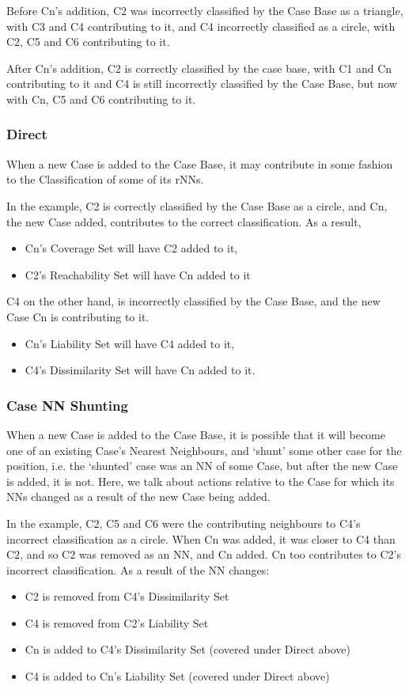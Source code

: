 \documentclass[a4paper,11pt]{report}
\begin{document}
Before Cn's addition, C2 was incorrectly classified by the Case Base as a triangle, with C3 and C4 contributing to it, and C4 incorrectly classified as a circle, with C2, C5 and C6 contributing to it.

After Cn's addition, C2 is correctly classified by the case base, with C1 and Cn contributing to it and C4 is still incorrectly classified by the Case Base, but now with Cn, C5 and C6 contributing to it.

\subsubsection{Direct}
When a new Case is added to the Case Base, it may contribute in some fashion to the Classification of some of its rNNs.

In the example, C2 is correctly classified by the Case Base as a circle, and Cn, the new Case added, contributes to the correct classification. As a result,
\begin{itemize}
	\item Cn's Coverage Set will have C2 added to it, 
	\item C2's Reachability Set will have Cn added to it
\end{itemize}

C4 on the other hand, is incorrectly classified by the Case Base, and the new Case Cn is contributing to it.
\begin{itemize}
	\item Cn's Liability Set will have C4 added to it,
	\item C4's Dissimilarity Set will have Cn added to it.
\end{itemize}

\subsubsection{Case NN Shunting}
When a new Case is added to the Case Base, it is possible that it will become one of an existing Case's Nearest Neighbours, and `shunt' some other case for the position, i.e. the `shunted' case was an NN of some Case, but after the new Case is added, it is not. Here, we talk about actions relative to the Case for which its NNs changed as a result of the new Case being added.

In the example, C2, C5 and C6 were the contributing neighbours to C4's incorrect classification as a circle. When Cn was added, it was closer to C4 than C2, and so C2 was removed as an NN, and Cn added. Cn too contributes to C2's incorrect classification.  As a result of the NN changes: 
\begin{itemize}
	\item C2 is removed from C4's Dissimilarity Set  
	\item C4 is removed from C2's Liability Set
	\item Cn is added to C4's Dissimilarity Set  (covered under Direct above)
	\item C4 is added to Cn's Liability Set (covered under Direct above)
\end{itemize}
\end{document}
